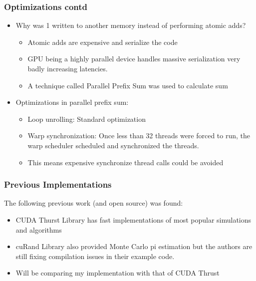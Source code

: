 \documentclass[mathserif]{beamer}
\begin{document}
\begin{frame}                                                                                                                                                                          
\frametitle{Optimizations contd}
\begin{itemize}
\item Why was 1 written to another memory instead of performing atomic adds? 
\begin{itemize}
\item Atomic adds are expensive and serialize the code 
\item GPU being a highly parallel device handles massive serialization very badly increasing latencies. 
\item A technique called Parallel Prefix Sum was used to calculate sum
\end{itemize}
\item Optimizations in parallel prefix sum:  
\begin{itemize}
\item Loop unrolling: Standard optimization 
\item Warp synchronization: Once less than 32 threads were forced to run, the warp scheduler scheduled and synchronized the threads. 
\item This means expensive synchronize thread calls could be avoided
\end{itemize}
\end{itemize}
\end{frame}              

\begin{frame}                                                                                                                                                                          
\frametitle{Previous Implementations}
The following previous work (and open source) was found:
\begin{itemize}
\item CUDA Thurst Library has fast implementations of most popular simulations and algorithms 
\item cuRand Library also provided Monte Carlo pi estimation but the authors are still fixing compilation issues in their example code. 
\item Will be comparing my implementation with that of CUDA Thrust 
\end{itemize}
\end{frame}             
\end{document}

